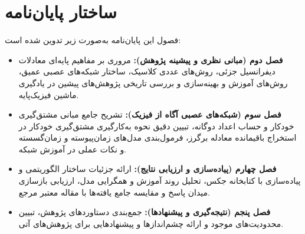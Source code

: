 \section{ساختار پایان‌نامه}
\label{sec:structure}

فصول این پایان‌نامه به‌صورت زیر تدوین شده است:
\begin{itemize}
\item \textbf{فصل دوم (مبانی نظری و پیشینه پژوهش):} مروری بر مفاهیم پایه‌ای معادلات دیفرانسیل جزئی، روش‌های عددی کلاسیک، ساختار شبکه‌های عصبی عمیق، روش‌های آموزش و بهینه‌سازی و بررسی تاریخی پژوهش‌های پیشین در یادگیری ماشین فیزیک‌پایه.
\item \textbf{فصل سوم (شبکه‌های عصبی آگاه از فیزیک):} تشریح جامع مبانی مشتق‌گیری خودکار و حساب اعداد دوگانه، تبیین دقیق نحوه به‌کارگیری مشتق‌گیری خودکار در استخراج باقیمانده معادله برگرز، فرمول‌بندی مدل‌های زمان‌پیوسته و زمان‌گسسته و نکات عملی در آموزش شبکه.
\item \textbf{فصل چهارم (پیاده‌سازی و ارزیابی نتایج):} ارائه جزئیات ساختار الگوریتمی و پیاده‌سازی با کتابخانه جکس، تحلیل روند آموزش و همگرایی مدل، ارزیابی بازسازی میدان پاسخ و مقایسه جامع یافته‌ها با مقاله معتبر مرجع.
\item \textbf{فصل پنجم (نتیجه‌گیری و پیشنهادها):} جمع‌بندی دستاوردهای پژوهش، تبیین محدودیت‌های موجود و ارائه چشم‌اندازها و پیشنهادهایی برای پژوهش‌های آتی.
\end{itemize}
